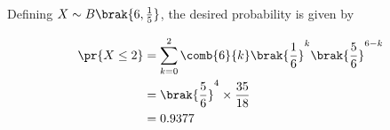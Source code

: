 Defining $X \sim B\brak{6,\frac{1}{5}}$, the desired probability is given by

\begin{align}
\pr{X \leq 2} &=  \sum_{k=0}^{2} \comb{6}{k}\brak{\frac{1}{6}}^k\brak{\frac{5}{6}}^{6-k} \\
&= \brak{\frac{5}{6}}^4 \times \frac{35}{18}\\
&= 0.9377
\end{align}